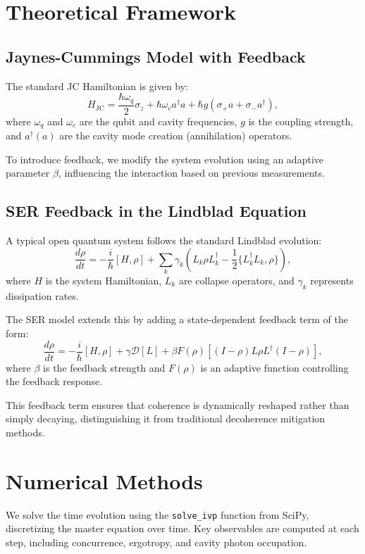\documentclass[a4paper,12pt]{article}
\begin{document}
\section{Theoretical Framework}

\subsection{Jaynes-Cummings Model with Feedback}
The standard JC Hamiltonian is given by:
\begin{equation}
H_{\text{JC}} = \frac{\hbar \omega_q}{2} \sigma_z + \hbar \omega_c a^\dagger a + \hbar g (\sigma_+ a + \sigma_- a^\dagger),
\end{equation}
where $\omega_q$ and $\omega_c$ are the qubit and cavity frequencies, $g$ is the coupling strength, and 
$a^\dagger (a)$ are the cavity mode creation (annihilation) operators.

To introduce feedback, we modify the system evolution using an adaptive parameter $\beta$, influencing the interaction 
based on previous measurements.

\subsection{SER Feedback in the Lindblad Equation}
A typical open quantum system follows the standard Lindblad evolution:
\begin{equation}
\frac{d\rho}{dt} = -\frac{i}{\hbar} [H, \rho] + \sum_k \gamma_k \left( L_k \rho L_k^\dagger - \frac{1}{2} \{L_k^\dagger L_k, \rho\} \right),
\end{equation}
where $H$ is the system Hamiltonian, $L_k$ are collapse operators, and $\gamma_k$ represents dissipation rates.

The SER model extends this by adding a state-dependent feedback term of the form:
\begin{equation}
\frac{d\rho}{dt} = -\frac{i}{\hbar} [H, \rho ] + \gamma \mathcal{D}[L] + \beta F(\rho) \left[ (I - \rho) L \rho L^\dagger (I - \rho) \right],
\end{equation}
where $\beta$ is the feedback strength and $F(\rho)$ is an adaptive function controlling the feedback response.

This feedback term ensures that coherence is dynamically reshaped rather than simply decaying, distinguishing it from traditional decoherence mitigation methods.

\section{Numerical Methods}
We solve the time evolution using the \texttt{solve\_ivp} function from SciPy, discretizing the master equation over time. 
Key observables are computed at each step, including concurrence, ergotropy, and cavity photon occupation.
\end{document}
